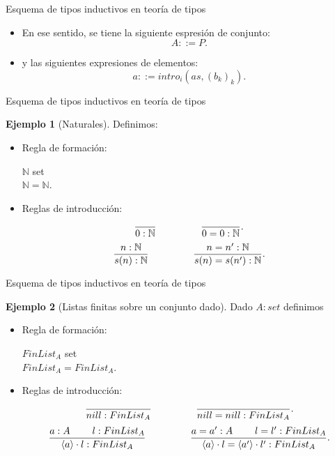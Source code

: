 \documentclass[dvipsnames, 8pt]{beamer} %
\theoremstyle{plain}
\newcommand{\N}{\mathbb{N}}
\theoremstyle{definition}
\newtheorem{ejemplo}{Ejemplo}
\begin{document}
\begin{frame}{Esquema de tipos inductivos en teoría de tipos}
    \begin{itemize}
        \item En ese sentido, se tiene la siguiente espresión de conjunto:\pause
        $$A::=P.$$\pause
        \item y las siguientes expresiones de elementos:\pause
        $$a::= intro_{i}(as,(b_k)_k).$$
    \end{itemize}
    
\end{frame}

\begin{frame}{Esquema de tipos inductivos en teoría de tipos}
    \begin{ejemplo}[Naturales]
        Definimos:\pause
        \begin{itemize}
            \item Regla de formación:\pgfshapeborderusesincirclefalse
            \begin{center}
                $\N$ set\\
                $\N=\N$.
            \end{center}\pause
            \item Reglas de introducción:\pause
            $$\frac{}{0:\N} \hspace{16mm} \frac{}{0=0:\N}.$$
            $$\frac{n:\N}{s(n):\N} \hspace{16mm} \frac{n = n':\N}{s(n) = s(n'):\N}.$$
        \end{itemize}
    \end{ejemplo}
\end{frame}

\begin{frame}{Esquema de tipos inductivos en teoría de tipos}
    \begin{ejemplo}[Listas finitas sobre un conjunto dado]
        Dado $A :set$ definimos\pause
        \begin{itemize}
            \item Regla de formación:\pause
            \begin{center}
                $FinList_A$ set\\
                $FinList_A=FinList_A$.\pause
            \end{center}
            \item Reglas de introducción:\pause
            $$\frac{}{nill:FinList_A} \hspace{16mm} \frac{}{nill=nill:FinList_A}.$$
            $$\frac{a:A\hspace{8mm}l:FinList_A}{\langle a\rangle\cdot l:FinList_A} \hspace{16mm} \frac{a=a':A\hspace{8mm}l=l':FinList_A}{\langle a\rangle\cdot l=\langle a'\rangle\cdot l':FinList_A}.$$
        \end{itemize}
    \end{ejemplo}    
\end{frame}
\end{document}
